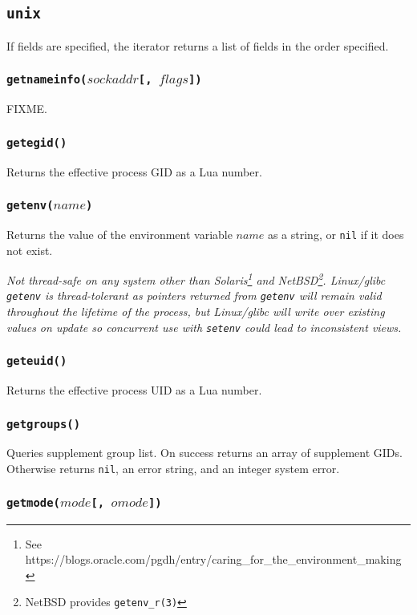 \documentclass[11pt, oneside]{memoir}
\newcommand*{\nil}[0]{\texttt{nil}\xspace}
\newcommand*{\syscall}[1]{\texttt{#1}\xspace}
\newcommand*{\fn}[1]{\texttt{#1}\xspace}
\newcounter{toccols}
\newenvironment{Module}[1]{
	\subsection{\texttt{#1}}
	\addtocontents{toc}{
		\protect\begin{multicols}{\value{toccols}}
	}
}{
	\addtocontents{toc}{\protect\end{multicols}}
}
\begin{document}
\begin{Module}{unix}
If fields are specified, the iterator returns a list of fields in the order specified.

\subsubsection[\fn{getnameinfo}]{\fn{getnameinfo($sockaddr$[, $flags$])}}

FIXME.

\subsubsection[\fn{getegid}]{\fn{getegid()}}

Returns the effective process GID as a Lua number.

\subsubsection[\fn{getenv}]{\fn{getenv($name$)}}

Returns the value of the environment variable $name$ as a string, or \nil if it does not exist.

\emph{Not thread-safe on any system other than Solaris\footnote{See https://blogs.oracle.com/pgdh/entry/caring\_for\_the\_environment\_making} and NetBSD\footnote{NetBSD provides \syscall{getenv\_r(3)}}. Linux/glibc \fn{getenv} is thread-tolerant as pointers returned from \syscall{getenv} will remain valid throughout the lifetime of the process, but Linux/glibc will write over existing values on update so concurrent use with \fn{setenv} could lead to inconsistent views.}

\subsubsection[\fn{geteuid}]{\fn{geteuid()}}

Returns the effective process UID as a Lua number.

\subsubsection[\fn{getgroups}]{\fn{getgroups()}}

Queries supplement group list. On success returns an array of supplement GIDs. Otherwise returns \nil, an error string, and an integer system error.

\subsubsection[\fn{getmode}]{\fn{getmode($mode$[, $omode$])}}


\end{Module}
\end{document}
